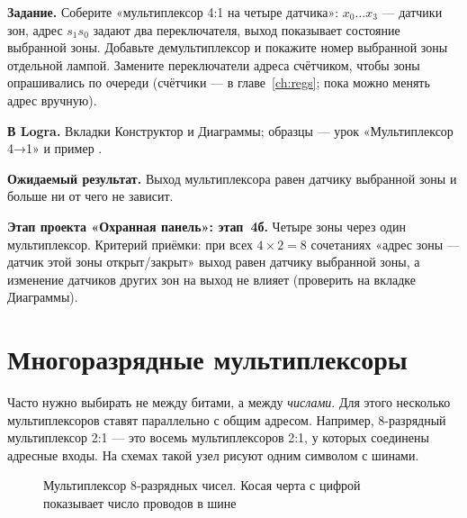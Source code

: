 \begin{diybox}
\textbf{Задание.}  Соберите «мультиплексор 4:1 на четыре датчика»:
$x_0\ldots x_3$ --- датчики зон, адрес $s_1s_0$ задают два переключателя,
выход показывает состояние выбранной зоны.  Добавьте демультиплексор
и покажите номер выбранной зоны отдельной лампой.  Замените
переключатели адреса счётчиком, чтобы зоны опрашивались по очереди
(счётчики --- в главе~\ref{ch:regs}; пока можно менять адрес вручную).

\textbf{В Logra.} Вкладки Конструктор и Диаграммы; образцы --- урок
«Мультиплексор 4→1» и пример .

\textbf{Ожидаемый результат.} Выход мультиплексора равен датчику выбранной зоны
и больше ни от чего не зависит.

\textbf{Этап проекта «Охранная панель»: этап~4б.} Четыре зоны через один
мультиплексор. Критерий приёмки: при всех $4\times 2=8$ сочетаниях «адрес
зоны --- датчик этой зоны открыт/закрыт» выход равен датчику выбранной зоны,
а изменение датчиков других зон на выход не влияет (проверить на вкладке
Диаграммы).
\end{diybox}

\section{Многоразрядные мультиплексоры}

Часто нужно выбирать не между битами, а между \emph{числами}. Для этого
несколько мультиплексоров ставят параллельно с общим адресом. Например,
8-разрядный мультиплексор 2:1 --- это восемь мультиплексоров 2:1, у
которых соединены адресные входы. На схемах такой узел рисуют одним символом
с шинами.

\begin{figure}[H]
\centering
{}
\caption{Мультиплексор 8-разрядных чисел. Косая черта с цифрой показывает число проводов в шине}
\end{figure}

